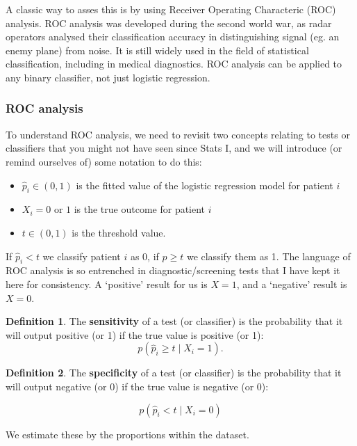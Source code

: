 \documentclass[
  openany]{book}
\providecommand{\tightlist}{%
  \setlength{\itemsep}{0pt}\setlength{\parskip}{0pt}}
\theoremstyle{definition}
\newtheorem{definition}{Definition}[chapter]
\theoremstyle{definition}
\theoremstyle{definition}
\theoremstyle{definition}
\theoremstyle{remark}
\begin{document}
A classic way to asses this is by using Receiver Operating Characteric (ROC) analysis. ROC analysis was developed during the second world war, as radar operators analysed their classification accuracy in distinguishing signal (eg. an enemy plane) from noise. It is still widely used in the field of statistical classification, including in medical diagnostics. ROC analysis can be applied to any binary classifier, not just logistic regression.

\subsubsection{ROC analysis}\label{roc-analysis}

To understand ROC analysis, we need to revisit two concepts relating to tests or classifiers that you might not have seen since Stats I, and we will introduce (or remind ourselves of) some notation to do this:

\begin{itemize}
\tightlist
\item
  \(\hat{p}_i\in\left(0,1\right)\) is the fitted value of the logistic regression model for patient \(i\)
\item
  \(X_i=0\) or \(1\) is the true outcome for patient \(i\)
\item
  \(t\in\left(0,1\right)\) is the threshold value.
\end{itemize}

If \(\hat{p}_i<t\) we classify patient \(i\) as 0, if \(\hat{p}\geq t\) we classify them as 1. The language of ROC analysis is so entrenched in diagnostic/screening tests that I have kept it here for consistency. A `positive' result for us is \(X=1\), and a `negative' result is \(X=0\).

\begin{definition}
The \textbf{sensitivity} of a test (or classifier) is the probability that it will output positive (or 1) if the true value is positive (or 1):
\[p\left(\hat{p}_i \geq t \mid{X_i=1}\right).\]
\end{definition}

\begin{definition}
The \textbf{specificity} of a test (or classifier) is the probability that it will output negative (or 0) if the true value is negative (or 0):

\[p\left(\hat{p}_i < t \mid{X_i=0}\right) \]
\end{definition}

We estimate these by the proportions within the dataset.
\end{document}

